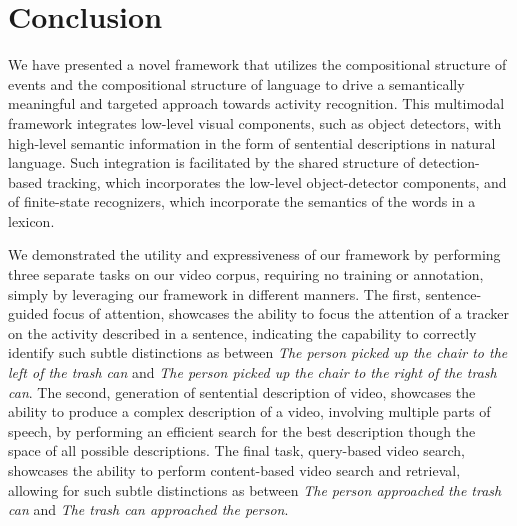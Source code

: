 \vspace*{-2ex}
\section{Conclusion}
\label{sec:conclusion}
\vspace*{-2ex}

We have presented a novel framework that utilizes the compositional structure
of events and the compositional structure of language to drive a semantically
meaningful and targeted approach towards activity recognition.
%
This multimodal framework integrates low-level visual components, such as object
detectors, with high-level semantic information in the form of sentential
descriptions in natural language.
%
Such integration is facilitated by the shared structure of detection-based
tracking, which incorporates the low-level object-detector components, and of
finite-state recognizers, which incorporate the semantics of the words in a
lexicon.

We demonstrated the utility and expressiveness of our framework by performing
three separate tasks on our video corpus, requiring no training or annotation,
simply by leveraging our framework in different manners.
%
The first, sentence-guided focus of attention, showcases the ability to focus
the attention of a tracker on the activity described in a sentence, indicating
the capability to correctly identify such subtle distinctions as between
\emph{The person picked up the chair to the left of the trash can} and \emph{The
  person picked up the chair to the right of the trash can}.
%
The second, generation of sentential description of video, showcases the
ability to produce a complex description of a video, involving multiple parts
of speech, by performing an efficient search for the best description though
the space of all possible descriptions.
%
The final task, query-based video search, showcases the ability to perform
content-based video search and retrieval, allowing for such subtle distinctions
as between \emph{The person approached the trash can} and \emph{The trash can
  approached the person}.
